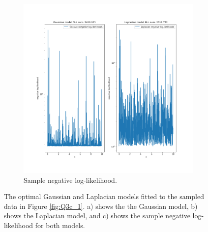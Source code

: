 \documentclass{article}
\begin{document}
\begin{figure}[!htb]
     \begin{subfigure}[b]{0.6\textwidth}
         \centering
         \includegraphics[width=\textwidth]{Q3c_fig5.png}
         \caption{Sample negative log-likelihood.}
     \end{subfigure}
        \caption{The optimal Gaussian and Laplacian models fitted to the sampled data in Figure \ref{fig:Q3c_1}. a) shows the the Gaussian model, b) shows the Laplacian model, and c) shows the sample negative log-likelihood for both models.}
        \label{fig:Q3c_2}
\end{figure}
\end{document}
